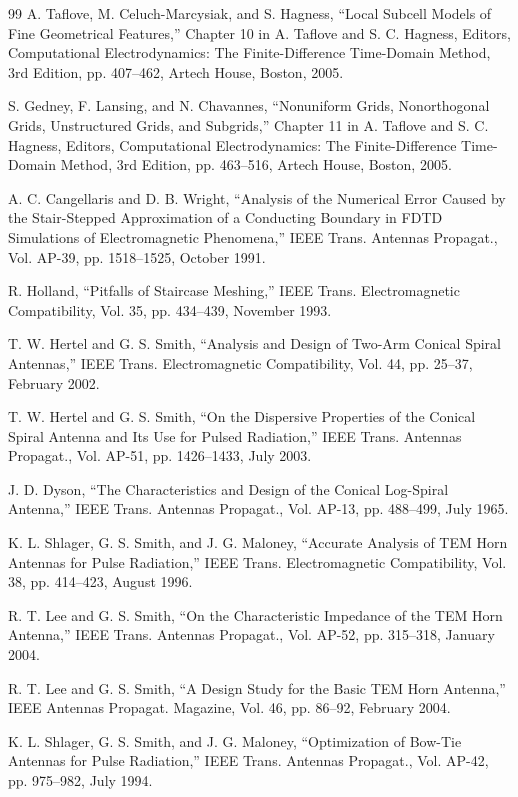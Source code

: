 \begin{thebibliography}{99}
 A. Taflove, M. Celuch-Marcysiak, and S. Hagness, ``Local Subcell Models of Fine Geometrical Features,'' Chapter 10 in A. Taflove and S. C. Hagness, Editors, Computational Electrodynamics: The Finite-Difference Time-Domain Method, 3rd Edition, pp. 407--462, Artech House, Boston, 2005.

 S. Gedney, F. Lansing, and N. Chavannes, ``Nonuniform Grids, Nonorthogonal Grids, Unstructured Grids, and Subgrids,'' Chapter 11 in A. Taflove and S. C. Hagness, Editors, Computational Electrodynamics: The Finite-Difference Time-Domain Method, 3rd Edition, pp. 463--516, Artech House, Boston, 2005.

 A. C. Cangellaris and D. B. Wright, ``Analysis of the Numerical Error Caused by the Stair-Stepped Approximation of a Conducting Boundary in FDTD Simulations of Electromagnetic Phenomena,'' IEEE Trans. Antennas Propagat., Vol. AP-39, pp. 1518--1525, October 1991.

 R. Holland, ``Pitfalls of Staircase Meshing,'' IEEE Trans. Electromagnetic Compatibility, Vol. 35, pp. 434--439, November 1993.

 T. W. Hertel and G. S. Smith, ``Analysis and Design of Two-Arm Conical Spiral Antennas,'' IEEE Trans. Electromagnetic Compatibility, Vol. 44, pp. 25--37, February 2002.

 T. W. Hertel and G. S. Smith, ``On the Dispersive Properties of the Conical Spiral Antenna and Its Use for Pulsed Radiation,'' IEEE Trans. Antennas Propagat., Vol. AP-51, pp. 1426--1433, July 2003.

 J. D. Dyson, ``The Characteristics and Design of the Conical Log-Spiral Antenna,'' IEEE Trans. Antennas Propagat., Vol. AP-13, pp. 488--499, July 1965.

 K. L. Shlager, G. S. Smith, and J. G. Maloney, ``Accurate Analysis of TEM Horn Antennas for Pulse Radiation,'' IEEE Trans. Electromagnetic Compatibility, Vol. 38, pp. 414--423, August 1996.

 R. T. Lee and G. S. Smith, ``On the Characteristic Impedance of the TEM Horn Antenna,'' IEEE Trans. Antennas Propagat., Vol. AP-52, pp. 315--318, January 2004.

 R. T. Lee and G. S. Smith, ``A Design Study for the Basic TEM Horn Antenna,'' IEEE Antennas Propagat. Magazine, Vol. 46, pp. 86--92, February 2004.

 K. L. Shlager, G. S. Smith, and J. G. Maloney, ``Optimization of Bow-Tie Antennas for Pulse Radiation,'' IEEE Trans. Antennas Propagat., Vol. AP-42, pp. 975--982, July 1994.


\end{thebibliography}
